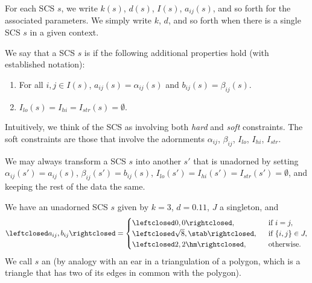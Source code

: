 For each SCS $s$, we write $k(s)$,
$d(s)$, $I(s)$, $a_{ij}(s)$, and so forth for the associated
parameters.   We simply write $k$, $d$, and so forth when there is a single
SCS $s$ in a given context.



%

\begin{definition}[unadorned]
We say that a SCS $s$ is  if the following additional
properties hold (with established notation):
\begin{enumerate}
\item For all $i,j\in I(s)$,  $a_{ij}(s)=\alpha_{ij}(s)$ and $b_{ij}(s)=\beta_{ij}(s)$.
\item $I_{lo}(s)=I_{hi}=I_{str}(s)=\emptyset$.
\end{enumerate}
\end{definition}

Intuitively, we think of the SCS as involving both {\it hard} and {\it
  soft} constraints.  The soft constraints are those that involve the
adornments $\alpha_{ij}$, $\beta_{ij}$, $I_{lo}$, $I_{hi}$, $I_{str}$.

\begin{example}\label{ex:extend-cs} 
We may always transform a SCS $s$ into another $s'$ that is unadorned by
setting $\alpha_{ij}(s')=a_{ij}(s)$, $\beta_{ij}(s')=b_{ij}(s)$, $I_{lo}(s')=I_{hi}(s')=I_{str}(s')=\emptyset$, and
keeping the rest of the data the same.
\end{example}


\begin{definition}[ear] 
We have an unadorned SCS $s$ given by
$k=3$, $d=0.11$, $J$ a singleton, 
and
\[
\leftclosed a_{ij},b_{ij}\rightclosed=
\begin{cases}
 \leftclosed0,0\rightclosed,
 &\text{~~if } i=j,\\
 \leftclosed\sqrt8,\stab\rightclosed,
 &\text{~~if } \{i,j\} \in J,\\
 \leftclosed 2,2\hm\rightclosed,
 &\text{~~otherwise. }
\end{cases}
\]
We call $s$ an  (by analogy with an ear
in a triangulation of a polygon, which is a triangle that has two of
its edges in common with the polygon).
\end{definition}


